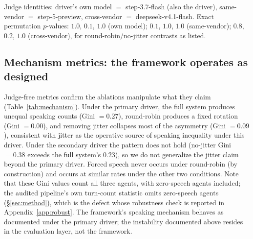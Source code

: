 \begin{table}[t]
\centering
\caption{Same-machine replication (secondary driver, three repetitions
per condition, mean overall $\pm$ SD). Identical transcripts; only the
judge differs. $\delta$ is Cliff's delta for full vs.\ ablated
condition.}
\label{tab:samemachine}
\small
{}

\smallskip
\noindent Judge identities: driver's own model $=$ step-3.7-flash (also
the driver), same-vendor $=$ step-5-preview, cross-vendor $=$
deepseek-v4.1-flash. Exact permutation $p$-values: $1.0$, $0.1$, $1.0$
(own model); $0.1$, $1.0$, $1.0$ (same-vendor); $0.8$, $0.2$, $1.0$
(cross-vendor), for round-robin/no-jitter contrasts as listed.
\end{table}

\subsection{Mechanism metrics: the framework operates as designed}
\label{sec:mechanism}

Judge-free metrics confirm the ablations manipulate what they claim
(Table~\ref{tab:mechanism}). Under the primary driver, the full system
produces unequal speaking counts (Gini $=0.27$), round-robin produces a
fixed rotation (Gini $=0.00$), and removing jitter collapses most of
the asymmetry (Gini $=0.09$), consistent with jitter as the operative
source of speaking inequality under this driver. Under the secondary
driver the pattern does not hold (no-jitter Gini $=0.38$ exceeds the
full system's $0.23$), so we do not generalize the jitter claim beyond
the primary driver. Forced speech never occurs under round-robin (by
construction) and occurs at similar rates under the other two
conditions. Note that these Gini values count all three agents, with
zero-speech agents included; the audited pipeline's own turn-count
statistic omits zero-speech agents (\S\ref{sec:method}), which is the
defect whose robustness check is reported in
Appendix~\ref{app:robust}. The framework's speaking mechanism behaves
as documented under the primary driver; the instability documented
above resides in the evaluation layer, not the framework.

